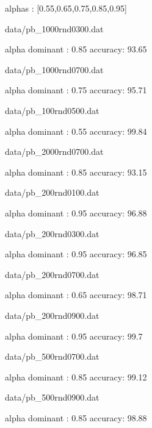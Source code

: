 
alphas : [0.55,0.65,0.75,0.85,0.95]

data/pb_1000rnd0300.dat

alpha dominant : 0.85
accuracy: 93.65%

  data/pb_1000rnd0700.dat

alpha dominant : 0.75
accuracy: 95.71%

  data/pb_100rnd0500.dat

alpha dominant : 0.55
accuracy: 99.84%

  data/pb_2000rnd0700.dat

alpha dominant : 0.85
accuracy: 93.15%

  data/pb_200rnd0100.dat

alpha dominant : 0.95
accuracy: 96.88%

  data/pb_200rnd0300.dat

alpha dominant : 0.95
accuracy: 96.85%

  data/pb_200rnd0700.dat

alpha dominant : 0.65
accuracy: 98.71%

  data/pb_200rnd0900.dat

alpha dominant : 0.95
accuracy: 99.7%

  data/pb_500rnd0700.dat

alpha dominant : 0.85
accuracy: 99.12%

  data/pb_500rnd0900.dat

alpha dominant : 0.85
accuracy: 98.88%
